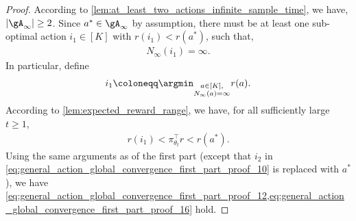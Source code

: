 \begin{proof}
According to \cref{lem:at_least_two_actions_infinite_sample_time}, we have, $| \gA_\infty | \ge 2$. Since $a^* \in \gA_\infty$ by assumption, there must be at least one sub-optimal action $i_1\in[K]$ with $r(i_1) < r(a^*)$, such that,
\begin{align}
\label{eq:general_action_global_convergence_second_part_proof_1}
    N_\infty(i_1) = \infty.
\end{align}
In particular, define
\begin{align}
\label{eq:general_action_global_convergence_second_part_proof_2}
    i_1 \coloneqq \argmin_{\substack{a \in [K], \\ N_\infty(a) = \infty}} r(a).
\end{align}
According to \cref{lem:expected_reward_range},  we have, for all sufficiently large $t \ge 1$,
\begin{align}
\label{eq:general_action_global_convergence_second_part_proof_3}
    r(i_1) < \pi_{\theta_t}^\top r < r(a^*).
\end{align}
Using the same arguments as of the first part (except that $i_2$ in \cref{eq:general_action_global_convergence_first_part_proof_10} is replaced with $a^*$), we have
\cref{eq:general_action_global_convergence_first_part_proof_12,eq:general_action_global_convergence_first_part_proof_16} hold. 


\end{proof}
